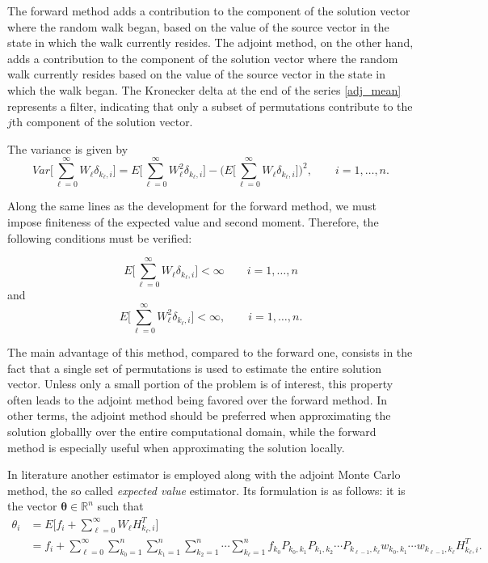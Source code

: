 \documentclass[final,leqno,onefignum,onetabnum]{siamltex1213}
\begin{document}
The forward method adds a contribution to the component of the solution
vector where the random walk began, based on the value of the source vector
in the state in which the walk currently resides.  The adjoint method,
on the other hand, adds a contribution to the component of the solution
vector where the random walk currently resides based on the value of the
source vector in the state in which the walk began.
The Kronecker delta at the end of the series \eqref{adj_mean} represents a 
filter, indicating
that only a subset of permutations contribute to the $j$th component
of the solution vector.

The variance is given by
\begin{equation}
Var\bigg [\sum_{\ell=0}^\infty W_{\ell}
\delta_{k_{\ell},i}\bigg]=E\bigg[\sum_{\ell=0}^\infty W_{\ell}^2
\delta_{k_{\ell},i}\bigg ] - \bigg 
(E\bigg[\sum_{\ell=0}^\infty
W_{\ell}
\delta_{k_{\ell},i}\bigg]\bigg )^2, \qquad i=1,\ldots,n
\label{adj_var}.
\end{equation}

Along the same lines as the development for the forward method, we must
impose finiteness of the expected value and second moment.
Therefore, the following
conditions must be verified:

\begin{equation}
 E\bigg[\sum_{\ell=0}^\infty W_{\ell}\delta_{k_{\ell},
i}\bigg]<\infty \qquad i=1,\ldots,n
\end{equation}
and
\begin{equation}
 E\bigg[\sum_{\ell=0}^\infty W_{\ell}^2
\delta_{k_{\ell},i}\bigg]<\infty, \qquad i=1,\ldots,n.
\end{equation}

The main advantage of this method, compared to the forward one, consists in the
fact that a single set of permutations is used to estimate the entire solution
vector.  Unless only a small portion of the problem is of interest, this
property often leads to the adjoint method being favored over the forward
method. 
 In other terms, the adjoint method should be preferred when approximating
the solution globallly over the entire computational domain, while the forward
method is especially useful when approximating the solution locally. 

In literature another estimator is employed along with the adjoint Monte Carlo
method, the so called \textit{expected value} estimator. Its
formulation is as follows: it is the vector
$\boldsymbol{\theta}\in \mathbb{R}^n$ such that
\begin{equation}
\begin{array}{rl}
\theta_i & =E\bigg[f_i + \sum_{\ell=0}^\infty
W_{\ell}H_{k_{\ell}, i}^T\bigg]\\
&=f_i 
+{\displaystyle \sum_{\ell=0}^{\infty}\sum_{k_0=1}^n\sum_{k_1=1}^n\sum_{k_2=1} ^n\cdots\sum_ 
{ k_ { \ell}=1}^n
f_{k_0}P_{k_0,k_1}P_{k_1,k_2}\cdots 
P_{k_{\ell-1},k_{\ell}}w_{k_0,k_1}\cdots
w_{k_{\ell-1},k_{\ell}}H_{k_{\ell},i}^T.}
\label{adj_mean1}
\end{array}
\end{equation}
\end{document}
